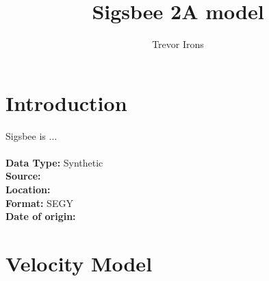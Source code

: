 \title{Sigsbee 2A model}
\author{Trevor Irons}
\section{Introduction}

Sigsbee is ...
\\
\\
\textbf	{
	Data Type:} Synthetic\\
\textbf	{   
	Source:} \\
\textbf {
 	Location:} \\
\textbf	{
       	Format:} SEGY \\
\textbf{
	Date of origin:}
       
\section{Velocity Model}

